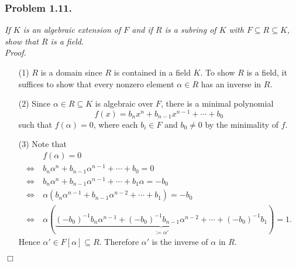 \documentclass{article}
\begin{document}



\subsubsection*{Problem 1.11.}
\emph{If $K$ is an algebraic extension of $F$ and if $R$ is a subring of $K$ with
$F \subseteq R \subseteq K$, show that $R$ is a field.} \\



\emph{Proof.}
\begin{enumerate}
\item[(1)]
  $R$ is a domain since $R$ is contained in a field $K$.
  To show $R$ is a field, it suffices to show that
  every nonzero element $\alpha \in R$ has an inverse in $R$.

\item[(2)]
  Since $\alpha \in R \subseteq K$ is algebraic over $F$,
  there is a minimal polynomial
  \[
    f(x) = b_n x^n + b_{n-1} x^{n-1} + \cdots + b_0
  \]
  such that $f(\alpha) = 0$,
  where each $b_i \in F$ and $b_0 \neq 0$ by the minimality of $f$.

\item[(3)]
  Note that
  \begin{align*}
    & \:
    f(\alpha) = 0 \\
    \Longleftrightarrow &\:
    b_n \alpha^n + b_{n-1} \alpha^{n-1} + \cdots + b_0 = 0 \\
    \Longleftrightarrow &\:
    b_n \alpha^n + b_{n-1} \alpha^{n-1} + \cdots + b_1 \alpha = -b_0 \\
    \Longleftrightarrow &\:
    \alpha(b_n \alpha^{n-1} + b_{n-1} \alpha^{n-2} + \cdots + b_1) = -b_0 \\
    \Longleftrightarrow &\:
    \alpha(\underbrace{(-b_0)^{-1} b_n \alpha^{n-1} + (-b_0)^{-1}b_{n-1} \alpha^{n-2} + \cdots
      + (-b_0)^{-1}b_1}_{:= \alpha'}) = 1.
  \end{align*}
  Hence $\alpha' \in F[\alpha] \subseteq R$.
  Therefore $\alpha'$ is the inverse of $\alpha$ in $R$.
\end{enumerate}
$\Box$ \\\\



\end{document}

